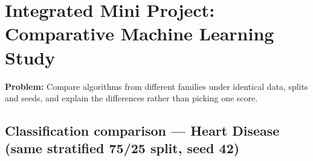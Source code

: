 
\chapter{Integrated Mini Project: Comparative Machine Learning
Study}\label{integrated-mini-project-comparative-machine-learning-study}

\textbf{Problem:} Compare algorithms from different families under
identical data, splits and seeds, and explain the differences rather
than picking one score.

\section{Classification comparison --- Heart Disease (same stratified
75/25 split, seed
42)}\label{classification-comparison-heart-disease-same-stratified-7525-split-seed-42}

